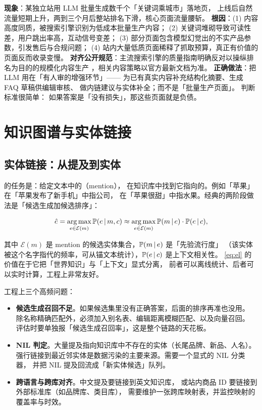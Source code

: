 \begin{pitfall}
\textbf{现象}：某独立站用 LLM 批量生成数千个「关键词乘城市」落地页，
上线后自然流量短期上升，两到三个月后整站排名下滑，核心页面流量腰斩。
\textbf{根因}：(1) 内容高度同质，被搜索引擎识别为低成本批量生产内容；
(2) 关键词堆砌导致可读性差，用户跳出率高，互动信号变差；
(3) 部分页面包含模型幻觉出的不实产品参数，引发售后与合规问题；
(4) 站内大量低质页面稀释了抓取预算，真正有价值的页面反而收录变慢。
\textbf{对齐公开规范}：主流搜索引擎的质量指南明确反对以操纵排名为目的的规模化内容生产
\cite{google2024quality,google2024seostarter}，相关内容策略以官方最新文档为准。
\textbf{正确做法}：把 LLM 用在「有人审的增强环节」——
为已有真实内容补充结构化摘要、生成 FAQ 草稿供编辑审核、
做内链建议与实体补全；而不是「批量生产页面」。
判断标准很简单：
如果答案是「没有损失」，那这些页面就是负债。
\end{pitfall}

\section{知识图谱与实体链接}

\subsection{实体链接：从提及到实体}

 的任务是：给定文本中的（mention），
在知识库中找到它指向的。例如「苹果」在「苹果发布了新手机」中指公司，
在「苹果很甜」中指水果。经典的两阶段做法是「候选生成加候选排序」：

\begin{equation}
\hat{e} = \operatorname*{arg\,max}_{e \in \mathcal{E}(m)} \operatorname{\mathbb{P}}(e \,\vert\, m, c)
\approx \operatorname*{arg\,max}_{e \in \mathcal{E}(m)} \operatorname{\mathbb{P}}(m \,\vert\, e) \cdot \operatorname{\mathbb{P}}(e \,\vert\, c),
\label{eq:el}
\end{equation}

其中 $\mathcal{E}(m)$ 是 mention 的候选实体集合，$\operatorname{\mathbb{P}}(m \,\vert\, e)$ 是「先验流行度」
（该实体被这个名字指代的频率，可从锚文本统计），$\operatorname{\mathbb{P}}(e \,\vert\, c)$ 是上下文相关性。
\cref{eq:el} 的价值在于它把「世界知识」与「上下文」显式分离，
前者可以离线统计、后者可以实时计算，工程上非常友好。

工程上三个高频问题：

\begin{itemize}
  \item \textbf{候选生成召回不足}。如果候选集里没有正确答案，后面的排序再准也没用。
        除名称精确匹配外，必须加入别名表、编辑距离模糊匹配、以及向量召回。
        评估时要单独报「候选生成召回率」，这是整个链路的天花板。
  \item \textbf{NIL 判定}。大量提及指向知识库中不存在的实体（长尾品牌、新品、人名）。
        强行链接到最近邻实体是数据污染的主要来源。需要一个显式的 NIL 分类器，
        并把 NIL 提及回流成「新实体候选」队列。
  \item \textbf{跨语言与跨库对齐}。中文提及要链接到英文知识库，
        或站内商品 ID 要链接到外部标准库（如品牌库、类目库），
        需要维护一张跨库映射表，并监控映射的覆盖率与时效。
\end{itemize}

